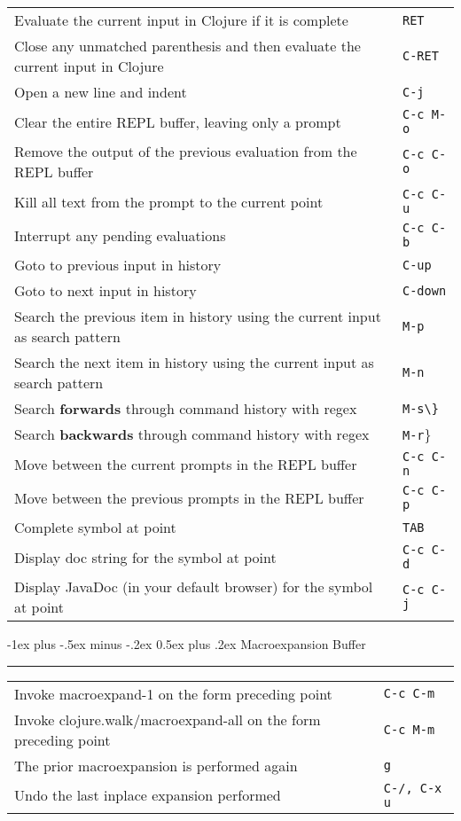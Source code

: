 \documentclass[12pt,landscape]{article}
\makeatletter
\renewcommand{\section}{\@startsection{section}{1}{0mm}%
                                {-1ex plus -.5ex minus -.2ex}%
                                {0.5ex plus .2ex}%
                                {\normalfont\large\bfseries}}
\makeatother
\begin{document}
\begin{multicols}{3}
\begin{tabular}{p{6cm}p{1cm}}
  Evaluate the current input in Clojure if it is complete & \verb!RET! \\
  Close any unmatched parenthesis and then evaluate the current input in Clojure & \verb!C-RET! \\
  Open a new line and indent & \verb!C-j! \\
  Clear the entire REPL buffer, leaving only a prompt & \verb!C-c M-o! \\
  Remove the output of the previous evaluation from the REPL buffer & \verb!C-c C-o! \\
  Kill all text from the prompt to the current point & \verb!C-c C-u! \\
  Interrupt any pending evaluations & \verb!C-c C-b! \\
  Goto to previous input in history & \verb!C-up! \\
  Goto to next input in history & \verb!C-down! \\
  Search the previous item in history using the current input as search pattern & \verb!M-p! \\
  Search the next item in history using the current input as search pattern & \verb!M-n! \\
  Search {\bf forwards } through command history with regex & \verb!M-s\}! \\
  Search {\bf backwards} through command history with regex & \verb!M-r!\} \\
  Move between the current prompts in the REPL buffer & \verb!C-c C-n! \\
  Move between the previous prompts in the REPL buffer & \verb!C-c C-p! \\
  Complete symbol at point & \verb!TAB! \\
  Display doc string for the symbol at point & \verb!C-c C-d! \\
  Display JavaDoc (in your default browser) for the symbol at point & \verb!C-c C-j! \\
\end{tabular}


\vfill
\columnbreak

\section{Macroexpansion Buffer}\smallskip \hrule height 2pt \smallskip
\begin{tabular}{p{6cm}p{1cm}} %
	
	Invoke macroexpand-1 on the form preceding point & \verb!C-c C-m! \\
	Invoke clojure.walk/macroexpand-all on the form preceding point & \verb!C-c M-m! \\
	The prior macroexpansion is performed again & \verb!g! \\
	Undo the last inplace expansion performed & \verb!C-/, C-x u! \\
	

\end{tabular}
\end{multicols}
\end{document}
